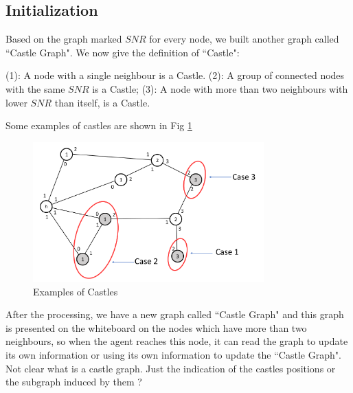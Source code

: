 \subsection{ Initialization}
Based on the graph marked $SNR$ for every node, we built another graph called ``Castle Graph". 
We now give the definition of ``Castle":
\begin{definition}
\noindent (1): A node with a single neighbour is a Castle.
\noindent (2): A group of connected nodes with the same $SNR$  is a Castle;
\noindent (3): A node with more than two neighbours with lower $SNR$ than itself, is  a Castle.
\end{definition}
 

Some examples of castles are shown in Fig  \ref{fig:CastleExample}
\begin{figure}[H]
  \centering  
  \includegraphics[width=3.5in]{figures/CastleExample.png}
  \caption{Examples of Castles}\label{fig:CastleExample}
\end{figure} 

After the processing, we have a new graph called ``Castle Graph" and this graph is presented on the whiteboard on the nodes which have more than two neighbours, so when the agent reaches this node, it can read the graph to update its own information or using its own information to update the ``Castle Graph". 
\color{blue}
Not clear what is a castle graph. Just the indication of the castles positions  or the subgraph induced by them ?   \color{black}

